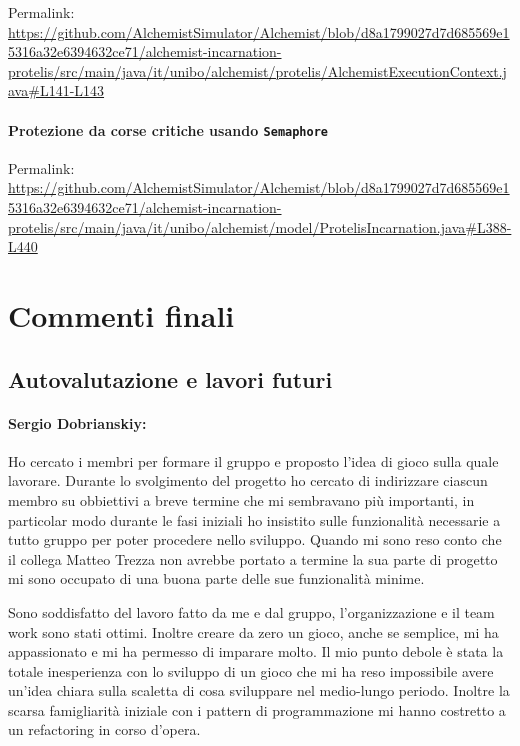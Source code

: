 \documentclass[a4paper,12pt]{report}
\begin{document}
Permalink: \url{https://github.com/AlchemistSimulator/Alchemist/blob/d8a1799027d7d685569e15316a32e6394632ce71/alchemist-incarnation-protelis/src/main/java/it/unibo/alchemist/protelis/AlchemistExecutionContext.java#L141-L143}

\subsubsection{Protezione da corse critiche usando \texttt{Semaphore}}

Permalink: \url{https://github.com/AlchemistSimulator/Alchemist/blob/d8a1799027d7d685569e15316a32e6394632ce71/alchemist-incarnation-protelis/src/main/java/it/unibo/alchemist/model/ProtelisIncarnation.java#L388-L440}


\chapter{Commenti finali}

\section{Autovalutazione e lavori futuri}
\subsubsection*{Sergio Dobrianskiy:}

Ho  cercato i membri per formare il gruppo e proposto l'idea di gioco sulla quale lavorare.
Durante lo svolgimento del progetto ho cercato di indirizzare ciascun membro su obbiettivi a breve termine che mi sembravano più importanti, in particolar modo durante le fasi iniziali ho insistito sulle funzionalità necessarie a tutto gruppo per poter procedere nello sviluppo. 
Quando mi sono reso conto che il collega Matteo Trezza non avrebbe portato a termine la sua parte di progetto mi sono occupato di una buona parte delle sue funzionalità minime.

Sono soddisfatto del lavoro fatto da me e dal gruppo, l'organizzazione e il team work sono stati ottimi. Inoltre creare da zero un gioco, anche se semplice, mi ha appassionato e mi ha permesso di imparare molto.
Il mio punto debole è stata la totale inesperienza con lo sviluppo di un gioco che mi ha reso impossibile avere un'idea chiara sulla scaletta di cosa sviluppare nel medio-lungo periodo. Inoltre la scarsa famigliarità iniziale con i pattern di programmazione mi hanno costretto a un refactoring in corso d'opera. 
\end{document}
